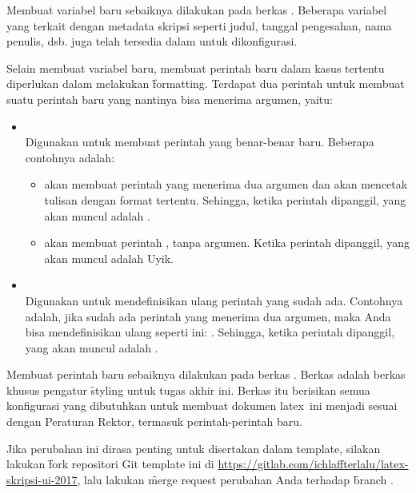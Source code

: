 Membuat variabel baru sebaiknya dilakukan pada berkas .
Beberapa variabel yang terkait dengan metadata skripsi seperti judul, tanggal pengesahan, nama penulis, dsb. juga telah tersedia dalam  untuk dikonfigurasi.

Selain membuat variabel baru, membuat perintah baru dalam kasus tertentu diperlukan dalam melakukan \f{formatting}.
Terdapat dua perintah untuk membuat suatu perintah baru yang nantinya bisa menerima argumen, yaitu:
\begin{itemize}
	\item {} \\
	Digunakan untuk membuat perintah yang benar-benar baru. Beberapa contohnya adalah:
	\begin{itemize}
		\item {} akan membuat perintah  yang menerima dua argumen dan akan mencetak tulisan dengan format tertentu.
		Sehingga, ketika perintah  dipanggil, yang akan muncul adalah .
		\item {} akan membuat perintah , tanpa argumen.
		Ketika perintah  dipanggil, yang akan muncul adalah Uyik.
	\end{itemize}
	\item {} \\
	Digunakan untuk mendefinisikan ulang perintah yang sudah ada.
	Contohnya adalah, jika sudah ada perintah  yang menerima dua argumen, maka Anda bisa mendefinisikan ulang seperti ini: .
	Sehingga, ketika perintah  dipanggil, yang akan muncul adalah .
\end{itemize}

Membuat perintah baru sebaiknya dilakukan pada berkas .
Berkas  adalah berkas khusus pengatur \f{styling} untuk tugas akhir ini.
Berkas itu berisikan semua konfigurasi yang dibutuhkan untuk membuat dokumen \gls{latex}~ini menjadi sesuai dengan Peraturan Rektor, termasuk perintah-perintah baru.

Jika perubahan ini dirasa penting untuk disertakan dalam template, silakan lakukan \f{fork} repositori Git template ini di \url{https://gitlab.com/ichlaffterlalu/latex-skripsi-ui-2017}, lalu lakukan \f{merge request} perubahan Anda terhadap \f{branch} .


